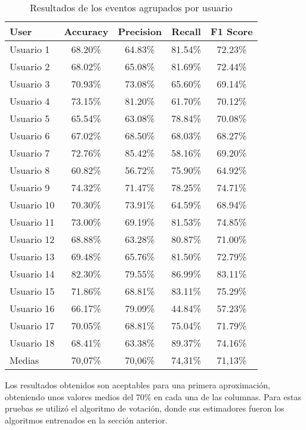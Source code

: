\begin{table}[h]
    \centering
\begin{tabular}{l c c c c}
\toprule
User & Accuracy & Precision &  Recall & F1 Score\\
\midrule
 Usuario 1      &    68.20\% &    64.83\% &  81.54\% &   72.23\% \\
 Usuario 2      &    68.02\% &    65.08\% &  81.69\% &   72.44\% \\
 Usuario 3      &    70.93\% &    73.08\% &  65.60\% &   69.14\% \\
 Usuario 4      &    73.15\% &    81.20\% &  61.70\% &   70.12\% \\
 Usuario 5      &    65.54\% &    63.08\% &  78.84\% &   70.08\% \\
 Usuario 6      &    67.02\% &    68.50\% &  68.03\% &   68.27\% \\
 Usuario 7      &    72.76\% &    85.42\% &  58.16\% &   69.20\% \\
 Usuario 8      &    60.82\% &    56.72\% &  75.90\% &   64.92\% \\
 Usuario 9      &    74.32\% &    71.47\% &  78.25\% &   74.71\% \\
 Usuario 10     &    70.30\% &    73.91\% &  64.59\% &   68.94\% \\
 Usuario 11     &    73.00\% &    69.19\% &  81.53\% &   74.85\% \\
 Usuario 12     &    68.88\% &    63.28\% &  80.87\% &   71.00\% \\
 Usuario 13     &    69.48\% &    65.76\% &  81.50\% &   72.79\% \\
 Usuario 14     &    82.30\% &    79.55\% &  86.99\% &   83.11\% \\
 Usuario 15     &    71.86\% &    68.81\% &  83.11\% &   75.29\% \\
 Usuario 16     &   66.17\% &    79.09\% &  44.84\% &   57.23\% \\
 Usuario 17     &   70.05\% &    68.81\% &  75.04\% &   71.79\% \\
 Usuario 18     &   68.41\% &    63.38\% &  89.37\% &   74.16\% \\
 \midrule
 Medias          & 70,07\% &  	70,06\% &  	74,31\% &  	71,13\%  \\
\bottomrule
\end{tabular}
    \caption{Resultados de los eventos agrupados por usuario}
    \label{tab:combine_results}
\end{table}

Los resultados obtenidos son aceptables para una primera aproximación, obteniendo unos valores medios del 70\% en cada una de las columnas. Para estas pruebas se utilizó el algoritmo de votación, donde sus estimadores fueron los algoritmos entrenados en la sección anterior.


